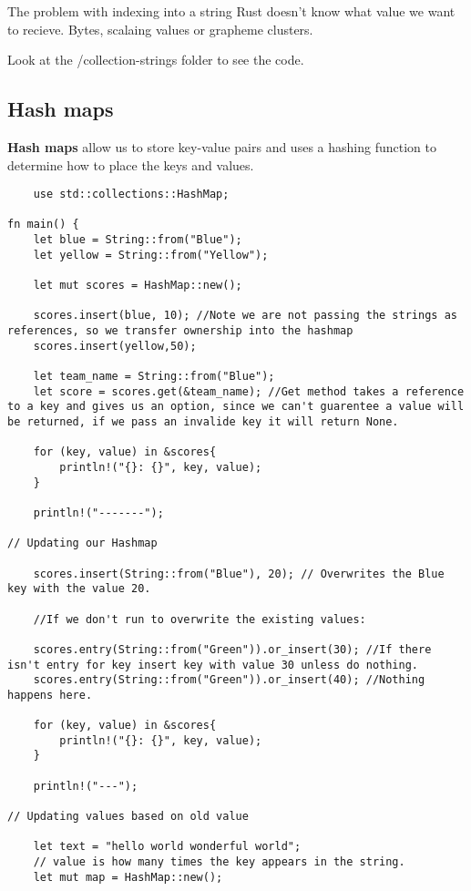 The problem with indexing into a string Rust doesn't know what value we want to recieve. Bytes, scalaing values or grapheme clusters.

Look at the /collection-strings folder to see the code.

\subsection{Hash maps}

\begin{definition}
    \textbf{Hash maps} allow us to store key-value pairs and uses a hashing function to determine how to place the keys and values.
\end{definition}
\newpage
\begin{lstlisting}
    use std::collections::HashMap;

fn main() {
    let blue = String::from("Blue");
    let yellow = String::from("Yellow");

    let mut scores = HashMap::new();

    scores.insert(blue, 10); //Note we are not passing the strings as references, so we transfer ownership into the hashmap
    scores.insert(yellow,50);

    let team_name = String::from("Blue");
    let score = scores.get(&team_name); //Get method takes a reference to a key and gives us an option, since we can't guarentee a value will be returned, if we pass an invalide key it will return None.

    for (key, value) in &scores{
        println!("{}: {}", key, value);
    }

    println!("-------");

// Updating our Hashmap

    scores.insert(String::from("Blue"), 20); // Overwrites the Blue key with the value 20.

    //If we don't run to overwrite the existing values:

    scores.entry(String::from("Green")).or_insert(30); //If there isn't entry for key insert key with value 30 unless do nothing.
    scores.entry(String::from("Green")).or_insert(40); //Nothing happens here.

    for (key, value) in &scores{
        println!("{}: {}", key, value);
    }
    
    println!("---");

// Updating values based on old value

    let text = "hello world wonderful world";
    // value is how many times the key appears in the string.
    let mut map = HashMap::new();



\end{lstlisting}

